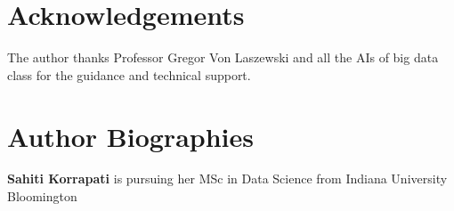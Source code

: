 \documentclass[9pt,twocolumn,twoside]{../../styles/osajnl}
\begin{document}
\section*{Acknowledgements}

The author thanks Professor Gregor Von Laszewski and all the AIs of big data class for the guidance and technical support.



 
\section*{Author Biographies}
\begingroup
\setlength\intextsep{0pt}
\begin{minipage}[t][3.2cm][t]{1.0\columnwidth} %
  \noindent
  {\bfseries Sahiti Korrapati} is pursuing her MSc in Data Science from
  Indiana University Bloomington
\end{minipage}
\endgroup
\end{document}

